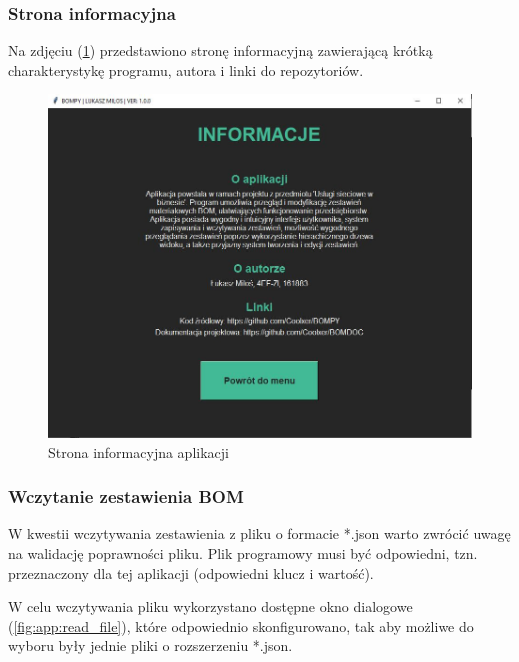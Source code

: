 \documentclass[12pt,twoside]{article}
\begin{document}
\subsubsection*{Strona informacyjna}

Na zdjęciu (\ref{fig:app:info}) przedstawiono stronę informacyjną zawierającą krótką charakterystykę programu, autora i linki do repozytoriów.
\begin{figure}[h]
	\centering
	\includegraphics[width=\textwidth]{figures/app/info.jpg}
	\caption{Strona informacyjna aplikacji}
\label{fig:app:info}
\end{figure}

\subsubsection*{Wczytanie zestawienia BOM}

W kwestii wczytywania zestawienia z pliku o formacie *.json warto zwrócić uwagę na walidację poprawności pliku. Plik programowy musi być odpowiedni, tzn. przeznaczony dla tej aplikacji (odpowiedni klucz i wartość). 

W celu wczytywania pliku wykorzystano dostępne okno dialogowe (\ref{fig:app:read_file}), które odpowiednio skonfigurowano, tak aby możliwe do wyboru były jednie pliki o rozszerzeniu *.json.
\end{document}
